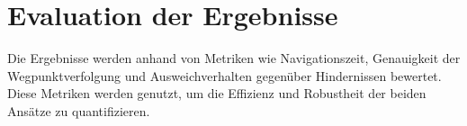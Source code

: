 \section{Evaluation der Ergebnisse}

Die Ergebnisse werden anhand von Metriken wie Navigationszeit, Genauigkeit der Wegpunktverfolgung und Ausweichverhalten gegenüber Hindernissen bewertet. 
Diese Metriken werden genutzt, um die Effizienz und Robustheit der beiden Ansätze zu quantifizieren.
